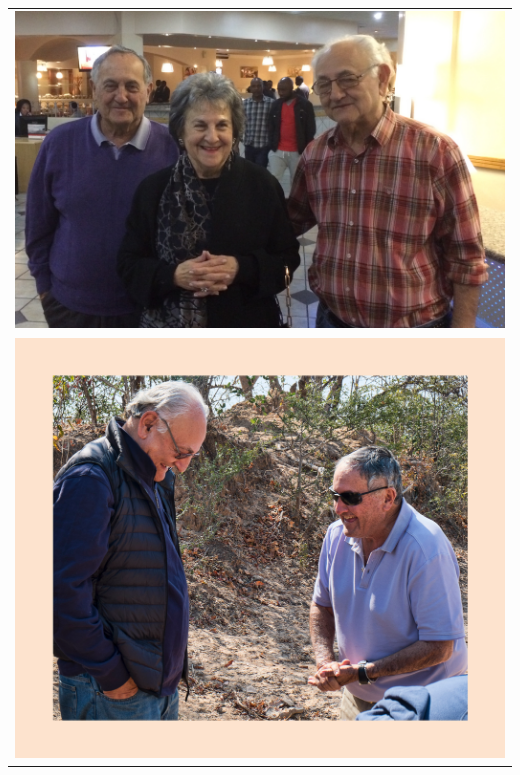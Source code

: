 \documentclass[extrafontsizes,twoside,17pt,a4paper,openany]{memoir}
\begin{document}
\newpage


\begin{tabular}{l}
\includegraphics[width=16cm]{figs/sonny-sheila-harry.jpg}\\[12pt]
\includegraphics[width=155mm]{figs/harrycrop.pdf}\\
\end{tabular}
\end{document}
